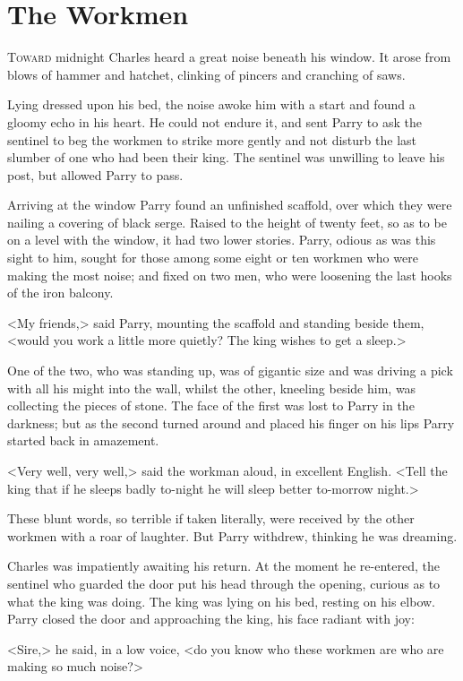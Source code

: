 \chapter{The Workmen}

 \lettrine{T}{oward} midnight Charles heard a great noise beneath his window. It arose from blows of hammer and hatchet, clinking of pincers and cranching of saws.

\zz
Lying dressed upon his bed, the noise awoke him with a start and found a gloomy echo in his heart. He could not endure it, and sent Parry to ask the sentinel to beg the workmen to strike more gently and not disturb the last slumber of one who had been their king. The sentinel was unwilling to leave his post, but allowed Parry to pass.

Arriving at the window Parry found an unfinished scaffold, over which they were nailing a covering of black serge. Raised to the height of twenty feet, so as to be on a level with the window, it had two lower stories. Parry, odious as was this sight to him, sought for those among some eight or ten workmen who were making the most noise; and fixed on two men, who were loosening the last hooks of the iron balcony.

<My friends,> said Parry, mounting the scaffold and standing beside them, <would you work a little more quietly? The king wishes to get a sleep.>

One of the two, who was standing up, was of gigantic size and was driving a pick with all his might into the wall, whilst the other, kneeling beside him, was collecting the pieces of stone. The face of the first was lost to Parry in the darkness; but as the second turned around and placed his finger on his lips Parry started back in amazement.

<Very well, very well,> said the workman aloud, in excellent English. <Tell the king that if he sleeps badly to-night he will sleep better to-morrow night.>

These blunt words, so terrible if taken literally, were received by the other workmen with a roar of laughter. But Parry withdrew, thinking he was dreaming.

Charles was impatiently awaiting his return. At the moment he re-entered, the sentinel who guarded the door put his head through the opening, curious as to what the king was doing. The king was lying on his bed, resting on his elbow. Parry closed the door and approaching the king, his face radiant with joy:

<Sire,> he said, in a low voice, <do you know who these workmen are who are making so much noise?>

